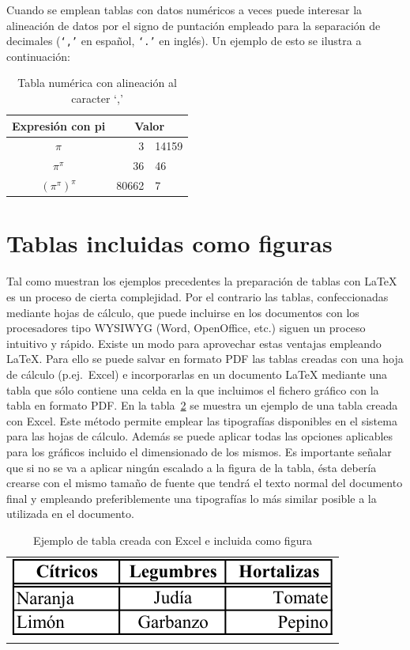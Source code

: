 \documentclass[11pt,a4paper]{article}
\begin{document}
Cuando se emplean tablas con datos numéricos a veces puede interesar la alineación de datos por el signo de puntación empleado para la separación de decimales (\texttt{`,'} en español, \texttt{`.'} en inglés). Un ejemplo de esto se ilustra a continuación:

\begin{table}[htb]%
	\centering
	\caption{Tabla numérica con alineación al caracter `,'}
	\label{tab:alineada}
	\begin{tabular}{c r@{,} l}
	Expresión con pi & \multicolumn{2}{c}{Valor} \\
	\hline
	$\pi$                   &      3 & 14159 \\
	$\pi^{\pi}$             & 36     &    46 \\
	$(\pi^{\pi})^{\pi}$     &  80662 & 7     \\
	\end{tabular}
\end{table}


\newpage
\section{Tablas incluidas como figuras}
Tal como muestran los ejemplos precedentes la preparación de tablas con \LaTeX{} es un proceso de cierta complejidad. Por el contrario las tablas, confeccionadas mediante hojas de cálculo, que puede incluirse en los documentos con los procesadores tipo WYSIWYG (Word, OpenOffice, etc.) siguen un proceso intuitivo y rápido. Existe un modo para aprovechar estas ventajas empleando \LaTeX{}. Para ello se puede salvar en formato PDF las tablas creadas con una hoja de cálculo (p.ej.\ \textsf{Excel}) e incorporarlas en un documento \LaTeX{} mediante una tabla que sólo contiene una celda en la que incluimos el fichero gráfico con la tabla en formato PDF. En la tabla~\ref{tab:figura} se muestra un ejemplo de una tabla creada con \textsf{Excel}. Este método permite emplear las tipografías disponibles en el sistema para las hojas de cálculo. Además se puede aplicar todas las opciones aplicables para los gráficos incluido el dimensionado de los mismos. Es importante señalar que si no se va a aplicar ningún escalado a la figura de la tabla, ésta debería crearse con el mismo tamaño de fuente que tendrá el texto normal del documento final y empleando preferiblemente una tipografías lo más similar posible a la utilizada en el documento.

\begin{table}[htb]%
	\centering
	\caption[Tabla \textsf{Excel}]{Ejemplo de tabla creada con \textsf{Excel} e incluida como figura}
	\label{tab:figura}
	\begin{tabular}{c}
		\includegraphics{alimentos}
	\end{tabular}
\end{table}
\end{document}
